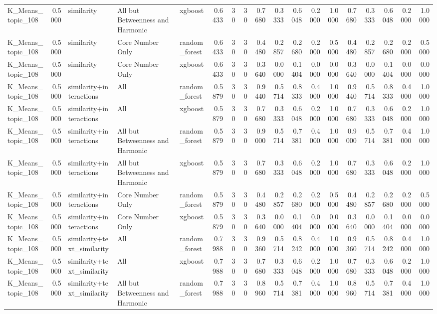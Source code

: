 \begin{tabular}{lrlllrrrrrrrrrrrrr}
K_Means_topic_108 & 0.5000 & similarity & All but Betweenness and Harmonic & xgboost & 0.6433 & 30 & 30 & 0.7680 & 0.3333 & 0.6048 & 0.2000 & 1.0000 & 0.7680 & 0.3333 & 0.6048 & 0.2000 & 1.0000 \\
K_Means_topic_108 & 0.5000 & similarity & Core Number Only & random_forest & 0.6433 & 30 & 30 & 0.4480 & 0.2857 & 0.2680 & 0.2000 & 0.5000 & 0.4480 & 0.2857 & 0.2680 & 0.2000 & 0.5000 \\
K_Means_topic_108 & 0.5000 & similarity & Core Number Only & xgboost & 0.6433 & 30 & 30 & 0.3640 & 0.0000 & 0.1404 & 0.0000 & 0.0000 & 0.3640 & 0.0000 & 0.1404 & 0.0000 & 0.0000 \\
K_Means_topic_108 & 0.5000 & similarity+interactions & All & random_forest & 0.5879 & 30 & 30 & 0.9440 & 0.5714 & 0.8333 & 0.4000 & 1.0000 & 0.9440 & 0.5714 & 0.8333 & 0.4000 & 1.0000 \\
K_Means_topic_108 & 0.5000 & similarity+interactions & All & xgboost & 0.5879 & 30 & 30 & 0.7680 & 0.3333 & 0.6048 & 0.2000 & 1.0000 & 0.7680 & 0.3333 & 0.6048 & 0.2000 & 1.0000 \\
K_Means_topic_108 & 0.5000 & similarity+interactions & All but Betweenness and Harmonic & random_forest & 0.5879 & 30 & 30 & 0.9000 & 0.5714 & 0.7381 & 0.4000 & 1.0000 & 0.9000 & 0.5714 & 0.7381 & 0.4000 & 1.0000 \\
K_Means_topic_108 & 0.5000 & similarity+interactions & All but Betweenness and Harmonic & xgboost & 0.5879 & 30 & 30 & 0.7680 & 0.3333 & 0.6048 & 0.2000 & 1.0000 & 0.7680 & 0.3333 & 0.6048 & 0.2000 & 1.0000 \\
K_Means_topic_108 & 0.5000 & similarity+interactions & Core Number Only & random_forest & 0.5879 & 30 & 30 & 0.4480 & 0.2857 & 0.2680 & 0.2000 & 0.5000 & 0.4480 & 0.2857 & 0.2680 & 0.2000 & 0.5000 \\
K_Means_topic_108 & 0.5000 & similarity+interactions & Core Number Only & xgboost & 0.5879 & 30 & 30 & 0.3640 & 0.0000 & 0.1404 & 0.0000 & 0.0000 & 0.3640 & 0.0000 & 0.1404 & 0.0000 & 0.0000 \\
K_Means_topic_108 & 0.5000 & similarity+text_similarity & All & random_forest & 0.7988 & 30 & 30 & 0.9360 & 0.5714 & 0.8242 & 0.4000 & 1.0000 & 0.9360 & 0.5714 & 0.8242 & 0.4000 & 1.0000 \\
K_Means_topic_108 & 0.5000 & similarity+text_similarity & All & xgboost & 0.7988 & 30 & 30 & 0.7680 & 0.3333 & 0.6048 & 0.2000 & 1.0000 & 0.7680 & 0.3333 & 0.6048 & 0.2000 & 1.0000 \\
K_Means_topic_108 & 0.5000 & similarity+text_similarity & All but Betweenness and Harmonic & random_forest & 0.7988 & 30 & 30 & 0.8960 & 0.5714 & 0.7381 & 0.4000 & 1.0000 & 0.8960 & 0.5714 & 0.7381 & 0.4000 & 1.0000 \\

\end{tabular}

